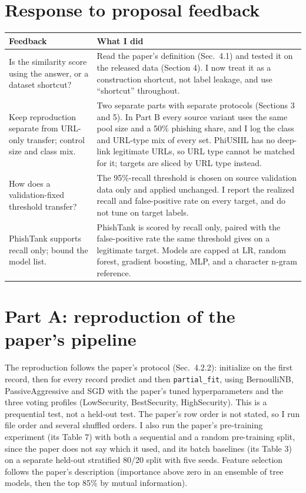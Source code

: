 \documentclass[10pt]{article}
\newcommand{\tsz}{\footnotesize}
\begin{document}
\section{Response to proposal feedback}
\begin{center}
\tsz
\begin{tabular}{@{}p{2.2in}p{4.7in}@{}}
\toprule
\textbf{Feedback} & \textbf{What I did} \\
\midrule
Is the similarity score using the answer, or a dataset shortcut? &
Read the paper's definition (Sec.\ 4.1) and tested it on the released data (Section 4). I now treat it as a construction shortcut, not label leakage, and use ``shortcut'' throughout. \\
Keep reproduction separate from URL-only transfer; control size and class mix. &
Two separate parts with separate protocols (Sections 3 and 5). In Part B every source variant uses the same pool size and a 50\% phishing share, and I log the class and URL-type mix of every set. PhiUSIIL has no deep-link legitimate URLs, so URL type cannot be matched for it; targets are sliced by URL type instead. \\
How does a validation-fixed threshold transfer? &
The 95\%-recall threshold is chosen on source validation data only and applied unchanged. I report the realized recall and false-positive rate on every target, and do not tune on target labels. \\
PhishTank supports recall only; bound the model list. &
PhishTank is scored by recall only, paired with the false-positive rate the same threshold gives on a legitimate target. Models are capped at LR, random forest, gradient boosting, MLP, and a character n-gram reference. \\
\bottomrule
\end{tabular}
\end{center}

\section{Part A: reproduction of the paper's pipeline}
The reproduction follows the paper's protocol (Sec.\ 4.2.2): initialize on the first record, then for every record predict and then \texttt{partial\_fit}, using BernoulliNB, PassiveAggressive and SGD with the paper's tuned hyperparameters and the three voting profiles (LowSecurity, BestSecurity, HighSecurity). This is a prequential test, not a held-out test. The paper's row order is not stated, so I run file order and several shuffled orders. I also run the paper's pre-training experiment (its Table 7) with both a sequential and a random pre-training split, since the paper does not say which it used, and its batch baselines (its Table 3) on a separate held-out stratified 80/20 split with five seeds. Feature selection follows the paper's description (importance above zero in an ensemble of tree models, then the top 85\% by mutual information).
\end{document}
